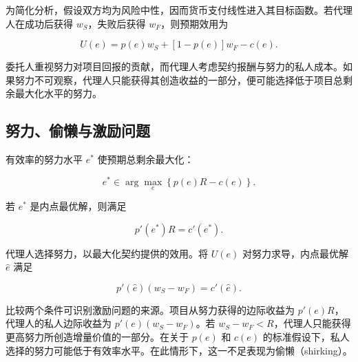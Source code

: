 为简化分析，假设双方均为风险中性，因而货币支付线性进入其目标函数。若代理人在成功后获得 $w_S$，失败后获得 $w_F$，则预期效用为

\begin{equation}
U(e)=p(e)w_S+[1-p(e)]w_F-c(e).
\label{eq:ch3-agent-utility}
\end{equation}

委托人重视努力对项目回报的贡献，而代理人考虑契约报酬与努力的私人成本。如果努力不可观察，代理人只能获得其创造收益的一部分，便可能选择低于项目总剩余最大化水平的努力。

\subsection{努力、偷懒与激励问题}

有效率的努力水平 $e^*$ 使预期总剩余最大化：


\begin{equation}
e^*\in\arg\max_e\left\{p(e)R-c(e)\right\}.
\label{eq:ch3-efficient-effort}
\end{equation}

若 $e^*$ 是内点最优解，则满足

\begin{equation}
p'(e^*)R=c'(e^*).
\label{eq:ch3-efficient-effort-foc}
\end{equation}

代理人选择努力，以最大化契约提供的效用。将 $U(e)$ 对努力求导，内点最优解 $\hat e$ 满足

\begin{equation}
p'(\hat e)(w_S-w_F)=c'(\hat e).
\label{eq:ch3-agent-effort-foc}
\end{equation}

比较两个条件可识别激励问题的来源。项目从努力获得的边际收益为 $p'(e)R$，代理人的私人边际收益为 $p'(e)(w_S-w_F)$。若 $w_S-w_F<R$，代理人只能获得更高努力所创造增量价值的一部分。在关于 $p(e)$ 和 $c(e)$ 的标准假设下，私人选择的努力可能低于有效率水平。在此情形下，这一不足表现为偷懒（shirking）。


